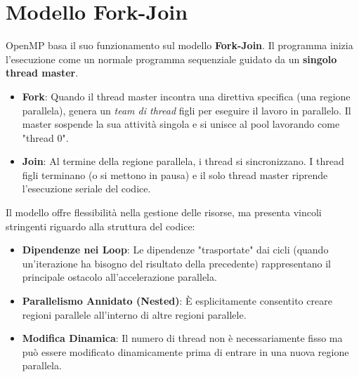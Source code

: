 \section{Modello Fork-Join} 
OpenMP basa il suo funzionamento sul modello \textbf{Fork-Join}. 
Il programma inizia l'esecuzione come un normale programma sequenziale guidato da un \textbf{singolo thread master}.
\begin{itemize}
    \item \textbf{Fork}: Quando il thread master incontra una direttiva specifica (una regione parallela), genera un \textit{team di thread} figli per eseguire il lavoro in parallelo. Il master sospende la sua attività singola e si unisce al pool lavorando come "thread 0".
    \item \textbf{Join}: Al termine della regione parallela, i thread si sincronizzano. I thread figli terminano (o si mettono in pausa) e il solo thread master riprende l'esecuzione seriale del codice.
\end{itemize}

Il modello offre flessibilità nella gestione delle risorse, ma presenta vincoli stringenti riguardo alla struttura del codice:
\begin{itemize}
    \item \textbf{Dipendenze nei Loop}: Le dipendenze "trasportate" dai cicli (quando un'iterazione ha bisogno del risultato della precedente) rappresentano il principale ostacolo all'accelerazione parallela.
    \item \textbf{Parallelismo Annidato (Nested)}: È esplicitamente consentito creare regioni parallele all'interno di altre regioni parallele.
    \item \textbf{Modifica Dinamica}: Il numero di thread non è necessariamente fisso ma può essere modificato dinamicamente prima di entrare in una nuova regione parallela.
\end{itemize}
